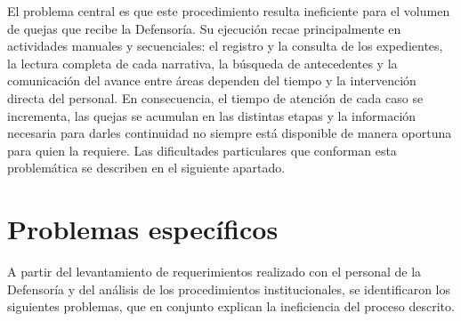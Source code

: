 	El problema central es que este procedimiento resulta ineficiente para el volumen de quejas que recibe la Defensoría. Su ejecución recae principalmente en actividades manuales y secuenciales: el registro y la consulta de los expedientes, la lectura completa de cada narrativa, la búsqueda de antecedentes y la comunicación del avance entre áreas dependen del tiempo y la intervención directa del personal. En consecuencia, el tiempo de atención de cada caso se incrementa, las quejas se acumulan en las distintas etapas y la información necesaria para darles continuidad no siempre está disponible de manera oportuna para quien la requiere. Las dificultades particulares que conforman esta problemática se describen en el siguiente apartado.

	\section{Problemas específicos}
	A partir del levantamiento de requerimientos realizado con el personal de la Defensoría y del análisis de los procedimientos institucionales, se identificaron los siguientes problemas, que en conjunto explican la ineficiencia del proceso descrito.

